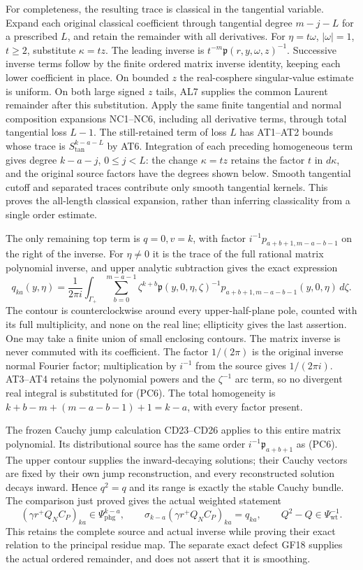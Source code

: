 \documentclass[
  11pt,
]{article}
\begin{document}
For completeness, the resulting trace is classical in the tangential
variable. Expand each original classical coefficient through tangential
degree \(m-j-L\) for a prescribed \(L\), and retain the remainder with
all derivatives. For \(\eta=t\omega\), \(|\omega|=1\), \(t\geq2\),
substitute \(\kappa=t z\). The leading inverse is
\(t^{-m}\mathfrak p(r,y,\omega,z)^{-1}\). Successive inverse terms
follow by the finite ordered matrix inverse identity, keeping each lower
coefficient in place. On bounded \(z\) the real-cosphere singular-value
estimate is uniform. On both large signed \(z\) tails, AL7 supplies the
common Laurent remainder after this substitution. Apply the same finite
tangential and normal composition expansions NC1--NC6, including all
derivative terms, through total tangential loss \(L-1\). The
still-retained term of loss \(L\) has AT1--AT2 bounds whose trace is
\(S^{k-a-L}_{\mathrm{tan}}\) by AT6. Integration of each preceding
homogeneous term gives degree \(k-a-j\), \(0\leq j<L\): the change
\(\kappa=t z\) retains the factor \(t\) in \(d\kappa\), and the original
source factors have the degrees shown below. Smooth tangential cutoff
and separated traces contribute only smooth tangential kernels. This
proves the all-length classical expansion, rather than inferring
classicality from a single order estimate.

The only remaining top term is \(q=0,v=k\), with factor
\(i^{-1}p_{a+b+1,m-a-b-1}\) on the right of the inverse. For
\(\eta\ne0\) it is the trace of the full rational matrix polynomial
inverse, and upper analytic subtraction gives the exact expression \[
 q_{ka}(y,\eta)=\frac{1}{2\pi i}\int_{\Gamma_+}
       \sum_{b=0}^{m-a-1}\zeta^{k+b}
       \mathfrak p(y,0,\eta,\zeta)^{-1}
       p_{a+b+1,m-a-b-1}(y,0,\eta)\,d\zeta.
 \tag{PC6}
\] The contour is counterclockwise around every upper-half-plane pole,
counted with its full multiplicity, and none on the real line;
ellipticity gives the last assertion. One may take a finite union of
small enclosing contours. The matrix inverse is never commuted with its
coefficient. The factor \(1/(2\pi)\) is the original inverse normal
Fourier factor; multiplication by \(i^{-1}\) from the source gives
\(1/(2\pi i)\). AT3--AT4 retains the polynomial powers and the
\(\zeta^{-1}\) arc term, so no divergent real integral is substituted
for (PC6). The total homogeneity is \(k+b-m+(m-a-b-1)+1=k-a\), with
every factor present.

The frozen Cauchy jump calculation CD23--CD26 applies to this entire
matrix polynomial. Its distributional source has the same order
\(i^{-1}\mathfrak p_{a+b+1}\) as (PC6). The upper contour supplies the
inward-decaying solutions; their Cauchy vectors are fixed by their own
jump reconstruction, and every reconstructed solution decays inward.
Hence \(q^2=q\) and its range is exactly the stable Cauchy bundle. The
comparison just proved gives the actual weighted statement \[
 (\gamma r^+Q_N C_P)_{ka}\in\Psi^{k-a}_{\mathrm{phg}},
 \qquad
 \sigma_{k-a}(\gamma r^+Q_N C_P)_{ka}=q_{ka},
 \qquad
 Q^2-Q\in\Psi^{-1}_{\mathrm{wt}}.
 \tag{PC7}
\] This retains the complete source and actual inverse while proving
their exact relation to the principal residue map. The separate exact
defect GF18 supplies the actual ordered remainder, and does not assert
that it is smoothing.
\end{document}

